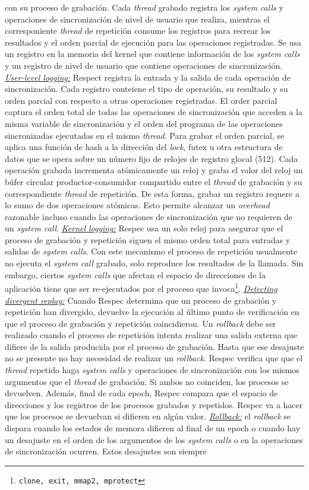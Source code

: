 con su proceso de grabación. Cada \emph{thread} grabado registra los \emph{system calls} y operaciones de sincronización de nivel de usuario que realiza, mientras el corresponiente \emph{thread} de repetición consume los registros para recrear los resultados y el orden parcial de ejecución para las operaciones registradas. Se usa un registro en la memoria del kernel que contiene información de los \emph{system calls} y un registro de nivel de usuario que contiene operaciones de sincronización. \underline{\emph{User-level logging:}} Respect registra la entrada y la salida de cada operación de sincronización. Cada registro conteiene el tipo de operación, su resultado y su orden parcial con respecto a otras operaciones registradas. El order parcial captura el orden total de todas las operaciones de sincronización que acceden a la misma variable de sincronización y el orden del programa de las operaciones sincronizadas ejecutadas en el mismo \emph{thread}. Para grabar el orden parcial, se aplica una función de hash a la dirección del \emph{lock}, futex u otra estructura de datos que se opera sobre un número fijo de relojes de registro glocal (512). Cada operación grabada incrementa atómicamente un reloj y graba el valor del reloj un búfer circular productor-consumidor compartido entre el \emph{thread} de grabación y su correspondiente \emph{thread} de repetición. De esta forma, grabar un registro requere a lo sumo de dos operaciones atómicas. Esto permite alcanzar un \emph{overhead} razonable incluso cuando las operaciones de sincronización que no requieren de un \emph{system call}. \underline{\emph{Kernel logging:}} Respec usa un solo reloj para asegurar que el proceso de grabación y repetición siguen el mismo orden total para entradas y salidas de \emph{system calls}. Con este mecanismo el proceso de repetición usualmente no ejecuta el \emph{system call} grabado, solo reproduce los resultados de la llamada. Sin embargo, ciertos \emph{system calls} que afectan el espacio de direcciones de la aplicación tiene que ser re-ejecutados por el proceso que invoca\footnote{\texttt{clone, exit, mmap2, mprotect}}. \underline{\emph{Detecting divergent replay:}} Cuando Respec determina que un proceso de grabación y repetición han divergido, devuelve la ejecución al último punto de verificación en que el proceso de grabación y repetición coincidieron. Un \emph{rollback} debe ser realizado cuando el proceso de repetición intenta realizar una salida externa que difiere de la salida producida por el proceso de grabación. Hasta que ese desajuste no se presente no hay necesidad de realizar un \emph{rollback}. Respec verifica que que el \emph{thread} repetido haga \emph{system calls} y operaciones de sincronización con los mismos argumentos que el \emph{thread} de grabación. Si ambos no coinciden, los procesos se devuelven. Además, final de cada epoch, Respec compara que el espacio de direcciones y los registros de los procesos grabados y repetidos. Respec va a hacer que los procesos se devuelvan si difieren en algún valor. \underline{\emph{Rollback:}} el \emph{rollback} se dispara cuando los estados de memora difieren al final de un epoch o cuando hay un desajuste en el orden de los argumentos de los \emph{system calls} o en la operaciones de sincronización ocurren. Estos desajustes son siempre 